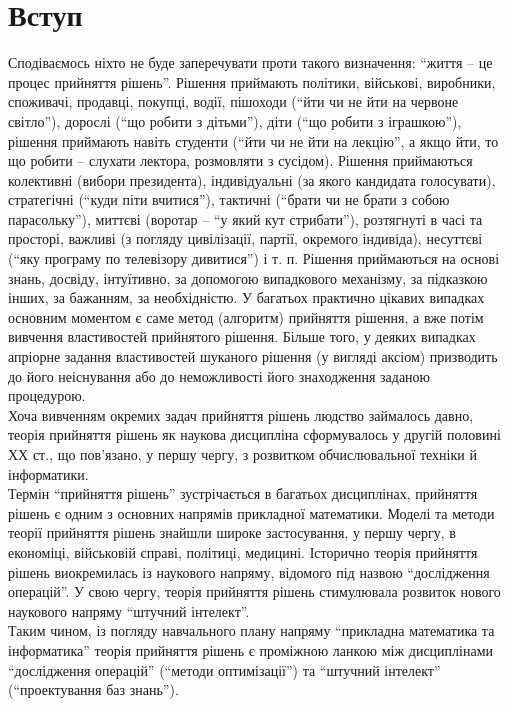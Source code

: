 \section*{Вступ}

Сподіваємось ніхто не буде заперечувати проти такого визначення: ``життя -- це процес прийняття рішень''. Рішення приймають політики, військові, виробники, споживачі, продавці, покупці, водії, пішоходи (``йти чи не йти на червоне світло''), дорослі (``що робити з дітьми''), діти (``що робити з іграшкою''), рішення приймають навіть студенти (``йти чи не йти на лекцію'', а якщо йти, то що робити -- слухати лектора, розмовляти з сусідом). Рішення приймаються колективні (вибори президента), індивідуальні (за якого кандидата голосувати), стратегічні (``куди піти вчитися''), тактичні (``брати чи не брати з собою парасольку''), миттєві (воротар -- ``у який кут стрибати''), розтягнуті в часі та просторі, важливі (з погляду цивілізації, партії, окремого індивіда), несуттєві (``яку програму по телевізору дивитися'') і т. п. Рішення приймаються на основі знань, досвіду, інтуїтивно, за допомогою випадкового механізму, за підказкою інших, за бажанням, за необхідністю. У багатьох практично цікавих випадках основним моментом є саме метод (алгоритм) прийняття рішення, а вже потім вивчення властивостей прийнятого рішення. Більше того, у деяких випадках апріорне задання властивостей шуканого рішення (у вигляді аксіом) призводить до його неіснування або до неможливості його знаходження заданою процедурою. \\

Хоча вивченням окремих задач прийняття рішень людство займалось давно, теорія прийняття рішень як наукова дисципліна сформувалось у другій половині ХХ ст., що пов'язано, у першу чергу, з розвитком обчислювальної техніки й інформатики. \\

Термін ``прийняття рішень'' зустрічається в багатьох дисциплінах, прийняття рішень є одним з основних напрямів прикладної математики. Моделі та методи теорії прийняття рішень знайшли широке застосування, у першу чергу, в економіці, військовій справі, політиці, медицині. Історично теорія прийняття рішень виокремилась із наукового напряму, відомого під назвою ``дослідження операцій''. У свою чергу, теорія прийняття рішень стимулювала розвиток нового наукового напряму ``штучний інтелект''. \\

Таким чином, із погляду навчального плану напряму ``прикладна математика та інформатика'' теорія прийняття рішень є проміжною ланкою між дисциплінами ``дослідження операцій'' (``методи оптимізації'') та ``штучний інтелект'' (``проектування баз знань'').